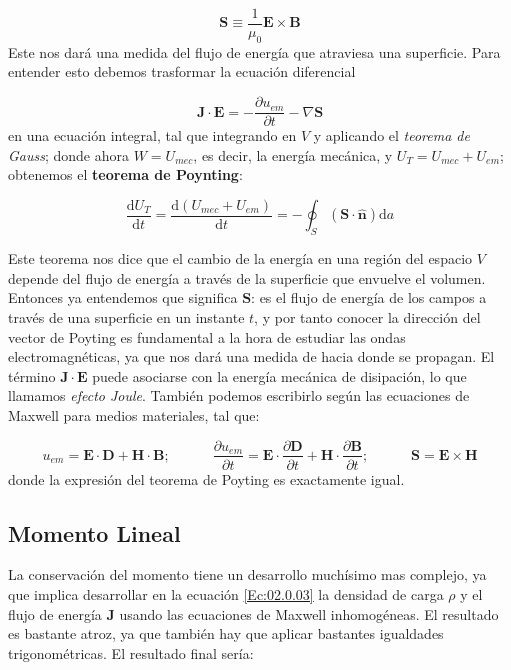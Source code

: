 \documentclass[12pt,a4paper]{article}
\newcommand{\parciales}[2]{\frac{\partial #1}{\partial #2}}
\newcommand{\derivadas}[2]{\frac{\D #1}{\D #2}}
\newcommand{\D}{\mathrm{d}}
\newcommand{\tquad}{\quad \quad \quad}
\newcommand{\Bn}{\mathbf{B}}
\newcommand{\En}{\mathbf{E}}
\newcommand{\Dn}{\mathbf{D}}
\newcommand{\Hn}{\mathbf{H}}
\newcommand{\Jn}{\mathbf{J}}
\newcommand{\Sn}{\mathbf{S}}
\newcommand{\hnn}{\hat{\mathbf{n}}}
\numberwithin{equation}{section}
\numberwithin{figure}{section}
\begin{document}
\begin{equation}
\Sn \equiv \dfrac{1}{\mu_0} \En \times \Bn
\end{equation}
Este nos dará una medida del flujo de energía que atraviesa una superficie. Para entender esto debemos trasformar la ecuación diferencial

\begin{equation}
\Jn \cdot \En = -  \parciales{u_{em}}{t} - \nabla \Sn
\end{equation}
en una ecuación integral, tal que integrando en $V$ y aplicando el \textit{teorema de Gauss}; donde ahora $W = U_{mec}$, es decir, la energía mecánica, y $U_T = U_{mec} + U_{em}$; obtenemos el \textbf{teorema de Poynting}:

\begin{equation}
\derivadas{U_T}{t} = \derivadas{(U_{mec} + U_{em})}{t} = - \oint_S (\Sn \cdot \hnn) \D a
\end{equation}

Este teorema nos dice que el cambio de la energía en una región del espacio $V$ depende del flujo de energía a través de la superficie que envuelve el volumen. Entonces ya entendemos que significa $\Sn$: es el flujo de energía de los campos a través de una superficie en un instante $t$, y por tanto conocer la dirección del vector de Poyting es fundamental a la hora de estudiar las ondas electromagnéticas, ya que nos dará una medida de hacia donde se propagan. El término $\Jn \cdot \En$ puede asociarse con la energía mecánica de disipación, lo que llamamos \textit{efecto Joule}.  También podemos escribirlo según las ecuaciones de Maxwell para medios materiales, tal que:

\begin{equation}
u_{em} = \En \cdot \Dn + \Hn \cdot \Bn ; \tquad \parciales{u_{em}}{t} = \En  \cdot \parciales{\Dn}{t} + \Hn \cdot \parciales{\Bn}{t}; \tquad \Sn = \En \times \Hn
\end{equation}
donde la expresión del teorema de Poyting es exactamente igual.


\subsection{Momento Lineal}

La conservación del momento tiene un desarrollo muchísimo mas complejo, ya que implica desarrollar en la ecuación \ref{Ec:02.0.03} la densidad de carga $\rho$ y el flujo de energía $\Jn$ usando las ecuaciones de Maxwell inhomogéneas. El resultado es bastante atroz, ya que también hay que aplicar bastantes igualdades trigonométricas. El resultado final sería:
\end{document}
